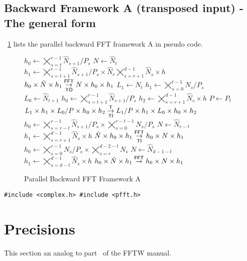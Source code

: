 \subsection{Backward Framework A (transposed input) - The general form}
\figurename{}~\ref{fig:fft_back_A} lists the parallel backward FFT framework A in pseudo code.
\begin{figure}[ht]
  \begin{algorithmic}[1]
      \State $h_0 \gets \bigtimes_{s=t}^{r-1}\hat N_{s+1}/P_s$
      \State $N   \gets \hat N_t$
      \State $h_1 \gets \bigtimes_{s=t+1}^{r-1} \hat N_{s+1}/ P_{s} \times \hat N_{r}  \bigtimes_{s=r+1}^{d-1} \hat N_s \times h$
      \State $h_0 \times \hat N \times h_1 \overset{\textsf{FFT}}{\underset{\textsf{TO}}{\rightarrow}} N \times h_0 \times h_1$
      \State
      \State $L_1 \gets N_t$
      \State $h_1 \gets \bigtimes_{s=0}^{t-1} N_{s}/P_{s}$
      \State $L_0 \gets \hat N_{t+1}$
      \State $h_0 \gets \bigtimes_{s=t+1}^{r-1}\hat N_{s+1}/P_{s}$
      \State $h_2 \gets \bigtimes_{s=r+1}^{d-1} \hat N_s \times h$
      \State $P   \gets P_{t}$
      \State $L_1 \times h_1 \times L_0/P \times h_0 \times h_2\overset{\textsf{T}}{\underset{\textsf{TI}}{\rightarrow}} L_1/P \times h_1 \times L_0 \times h_0 \times h_2$
    \EndFor
    \State $h_0 \gets \bigtimes_{s=r-t}^{r-1} \hat N_{s+1}/P_s \times \bigtimes_{s=0}^{r-t-1} N_s/P_s$
    \State $N   \gets \hat N_{r-t}$
    \State $h_1 \gets \bigtimes_{s=r+1}^{d-1} \hat N_s \times h$
    \State $\hat N \times h_0 \times h_1 \overset{\textsf{FFT}}{\underset{\textsf{TI}}{\rightarrow}} h_0 \times N \times h_1 $
      \State $h_0 \gets \bigtimes_{s=0}^{r-1} N_s/P_s \times \bigtimes_{s=r}^{d-2-t} N_s$
      \State $N   \gets \hat N_{d-1-t}$
      \State $h_1 \gets \bigtimes_{s=d-t}^{d-1} \hat N_s \times h$
      \State $h_0 \times \hat N \times h_1 \overset{\textsf{FFT}}{\rightarrow} h_0 \times N \times h_1$
    \EndFor
  \end{algorithmic}
  \caption{Parallel Backward FFT Framework A}\label{fig:fft_back_A}
\end{figure}


\begin{compactitem}
  \item[\mybox] \verb+#include <complex.h> #include <pfft.h>+
\end{compactitem}


\section{Precisions}\label{sec:prec}
This section an analog to part~\cite{fftw-prec} of the FFTW manual.

